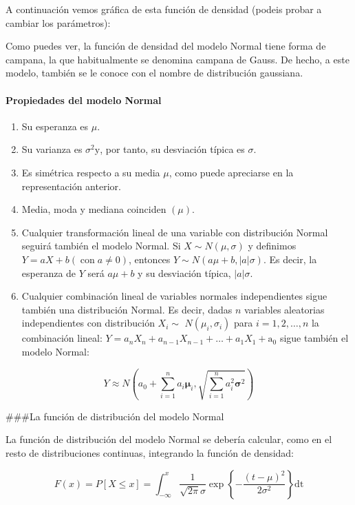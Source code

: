 \documentclass[
]{article}
\begin{document}
A continuación vemos gráfica de esta función de densidad (podeis probar a cambiar los parámetros):

Como puedes ver, la función de densidad del modelo Normal tiene forma de campana, la que habitualmente se denomina campana de Gauss. De hecho, a este modelo, también se le conoce con el nombre de distribución gaussiana.

\paragraph{Propiedades del modelo Normal}\label{propiedades-del-modelo-normal}

\begin{enumerate}
\def\labelenumi{\arabic{enumi}.}
\item
  Su esperanza es \(\mu\).
\item
  Su varianza es \(\sigma^{2} \mathrm{y}\), por tanto, su desviación típica es \(\sigma\).
\item
  Es simétrica respecto a su media \(\mu\), como puede apreciarse en la representación anterior.
\item
  Media, moda y mediana coinciden \((\mu)\).
\item
  Cualquier transformación lineal de una variable con distribución Normal seguirá también el modelo Normal. Si \(X \sim N(\mu, \sigma)\) y definimos \(Y=a X+b(\operatorname{con} a \neq 0)\), entonces \(Y \sim N(a \mu+b,|a| \sigma)\). Es decir, la esperanza de \(Y\) será \(a \mu+b\) y su desviación típica, \(|a| \sigma\).
\item
  Cualquier combinación lineal de variables normales independientes sigue también una distribución Normal. Es decir, dadas \(n\) variables aleatorias independientes con distribución \(X_{i} \sim\) \(N\left(\mu_{i}, \sigma_{i}\right)\) para \(i=1,2, \ldots, n\) la combinación lineal: \(Y=a_{n} X_{n}+a_{n-1} X_{n-1}+\ldots+a_{1} X_{1}+\mathrm{a}_{0}\) sigue también el modelo Normal:
\end{enumerate}

\[
Y \approx N\left(a_{0}+\sum_{i=1}^{n} a_{i} \boldsymbol{\mu}_{i}, \sqrt{\sum_{i=1}^{n} a_{i}^{2} \boldsymbol{\sigma}^{2}}\right)
\]

\#\#\#La función de distribución del modelo Normal

La función de distribución del modelo Normal se debería calcular, como en el resto de distribuciones continuas, integrando la función de densidad:

\[
F(x)=P[X \leq x]=\int_{-\infty}^{x} \frac{1}{\sqrt{2 \pi} \sigma} \exp \left\{-\frac{(t-\mu)^{2}}{2 \sigma^{2}}\right\} \mathrm{dt}
\]
\end{document}
